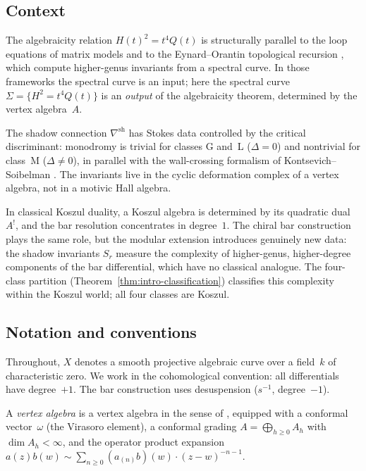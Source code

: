 \documentclass[11pt]{article}
\theoremstyle{plain}
\theoremstyle{definition}
\theoremstyle{remark}
\begin{document}
\subsection{Context}

The algebraicity relation $H(t)^2 = t^4 Q(t)$ is structurally
parallel to the loop equations of matrix models
\cite{ADKMV,DijkgraafVafa} and to the Eynard--Orantin
topological recursion \cite{EO}, which compute higher-genus
invariants from a spectral curve. In those frameworks the
spectral curve is an input; here the spectral
curve $\Sigma = \{H^2 = t^4 Q(t)\}$ is an \emph{output} of
the algebraicity theorem, determined by the vertex algebra~$A$.

The shadow connection $\nabla^{\mathrm{sh}}$ has Stokes data
controlled by the critical discriminant: monodromy is trivial
for classes G and~L ($\Delta = 0$) and nontrivial for class~M
($\Delta \neq 0$), in parallel with the wall-crossing
formalism of Kontsevich--Soibelman
\cite{KontsevichSoibelman}. The invariants live in
the cyclic deformation complex of a vertex algebra, not in
a motivic Hall algebra.

In classical Koszul duality, a Koszul algebra is determined by
its quadratic dual~$A^{!}$, and the bar resolution concentrates
in degree~$1$. The chiral bar construction plays the same role,
but the modular extension introduces genuinely new data: the
shadow invariants $S_r$ measure the complexity of higher-genus,
higher-degree components of the bar differential, which have no
classical analogue. The four-class partition
(Theorem~\ref{thm:intro-classification}) classifies this
complexity within the Koszul world; all four classes are Koszul.


\subsection{Notation and conventions}

Throughout, $X$ denotes a smooth projective algebraic curve
over a field~$k$ of characteristic zero. We work in the
cohomological convention: all differentials have degree~$+1$.
The bar construction uses desuspension ($s^{-1}$, degree~$-1$).

A \emph{vertex algebra} is a vertex algebra in the sense of
\cite{FrenkelBenZvi,Kac-vertex}, equipped with a conformal
vector~$\omega$ (the Virasoro element), a conformal grading
$A = \bigoplus_{h \geq 0} A_h$ with $\dim A_h < \infty$, and
the operator product expansion
$a(z)b(w) \sim \sum_{n \geq 0} (a_{(n)} b)(w) \cdot
(z-w)^{-n-1}$.
\end{document}
